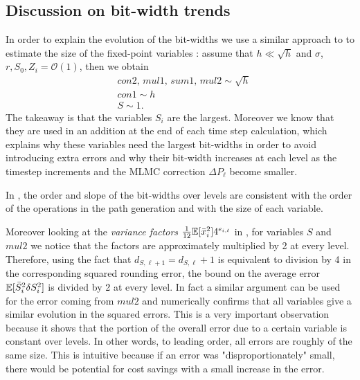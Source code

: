 \subsection{Discussion on bit-width trends}
In order to explain the evolution of the bit-widths we use a similar approach to \cite{Rounding_error_oliver} to estimate the size of the fixed-point variables : assume that $h\ll \sqrt{h}$ and $\sigma$, $r, S_0,Z_i = \mathcal{O}(1)$, then 
we obtain
\begin{align}
    &con2, \, mul1, \, sum1,\, mul2 \sim \sqrt{h} \\
    &con1 \sim h \\
    &S \sim 1.
\end{align}
The takeaway is that the variables $S_i$ are the largest. Moreover we know that they are used in an addition at the end of each time step calculation, which explains why these variables need the largest bit-widths in order to avoid introducing extra errors and why their bit-width increases at each level as the timestep increments and the MLMC correction $\Delta P_\ell$ become smaller.

In , the order and slope of the bit-widths over levels are consistent with the order of the operations in the path generation and with the size of each variable.


Moreover looking at the \textit{variance factors} $\frac{1}{12}\mathbb{E}[\Bar{x}^2_i]4^{e_{i,\ell}}$ in , for variables $S$ and $mul2$ we notice that the factors are approximately multiplied by 2 at every level. Therefore, using the fact 
that $d_{S,\ell+1}=d_{S,\ell}+1$ is equivalent to 
division by 4 in the corresponding squared rounding error, the bound on the average error $\mathbb{E}[\Bar{S}_i^2 \delta S^2_i]$ is divided by 2 at every level. In fact a similar argument can be used for the error coming from $mul2$ and numerically  confirms that all variables give a similar evolution in the squared errors. This is a very important observation because it shows that the portion of the overall error due to a certain variable is constant over levels. In other words, to leading order, all errors are roughly of the same size. This is intuitive because if an error was "disproportionately" small, there would be potential for cost savings with a small increase in the error.

